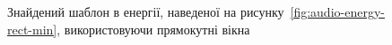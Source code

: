 \begin{figure}[h]

            \caption{Знайдений шаблон в енергії, наведеної на рисунку~\ref{fig:audio-energy-rect-min},
                використовуючи прямокутні вікна}
            \label{fig:matched-energy-rect-min-rect}
        \end{figure}

